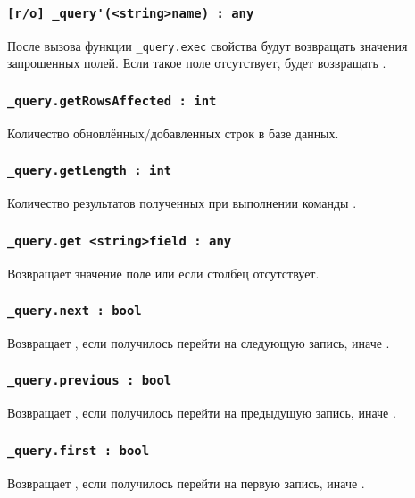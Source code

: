 \documentclass[a4paper, 14pt]{extarticle}
\begin{document}
\subsubsection{\lstinline|[r/o] _query'(<string>name) : any|}

После вызова функции \lstinline|_query.exec| свойства будут возвращать значения запрошенных полей. Если такое поле отсутствует, будет возвращать \void.

\subsubsection{\lstinline|_query.getRowsAffected : int|}

Количество обновлённых/добавленных строк в базе данных.

\subsubsection{\lstinline|_query.getLength : int|}

Количество результатов полученных при выполнении команды .

\subsubsection{\lstinline|_query.get <string>field : any|}

Возвращает значение поле или \void{} если столбец  отсутствует.

\subsubsection{\lstinline|_query.next : bool|}

Возвращает \true, если получилось перейти на следующую запись, иначе \false.

\subsubsection{\lstinline|_query.previous : bool|}

Возвращает \true, если получилось перейти на предыдущую запись, иначе \false.

\subsubsection{\lstinline|_query.first : bool|}

Возвращает \true, если получилось перейти на первую запись, иначе \false.
\end{document}
